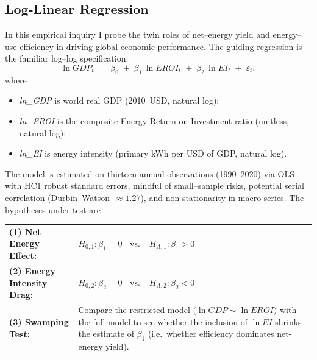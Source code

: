\documentclass[a4paper,12pt]{article}
\begin{document}
\subsection{Log-Linear Regression}
In this empirical inquiry I probe the twin roles of net--energy yield and
energy--use efficiency in driving global economic performance.  The guiding
regression is the familiar log--log specification:
\[
    \ln GDP_{t}
    \;=\;
    \beta_{0}
    \;+\;
    \beta_{1}\,\ln EROI_{t}
    \;+\;
    \beta_{2}\,\ln EI_{t}
    \;+\;
    \varepsilon_{t},
\]
where
\begin{itemize}[leftmargin=1.5em]
    \item \emph{ln\_GDP} is world real GDP (2010~USD, natural log);
    \item \emph{ln\_EROI} is the composite Energy Return on Investment ratio
          (unitless, natural log);
    \item \emph{ln\_EI} is energy intensity (primary kWh per USD of GDP,
          natural log).
\end{itemize}

The model is estimated on thirteen annual observations (1990--2020) via OLS with
HC1 robust standard errors, mindful of small--sample risks, potential serial
correlation (Durbin--Watson~$\approx 1.27$), and non-stationarity in macro
series.  The hypotheses under test are

\begin{center}
\begin{tabularx}{\textwidth}{@{}l X@{}}
\textbf{(1) Net Energy Effect:} &
  $H_{0,1}: \beta_{1}=0 \;\;$ vs.\ $\;\; H_{A,1}: \beta_{1}>0$ \\[4pt]

\textbf{(2) Energy–Intensity Drag:} &
  $H_{0,2}: \beta_{2}=0 \;\;$ vs.\ $\;\; H_{A,2}: \beta_{2}<0$ \\[4pt]

\textbf{(3) Swamping Test:} &
  Compare the restricted model $\bigl(\ln GDP \sim \ln EROI\bigr)$ with the
  full model to see whether the inclusion of $\ln EI$ shrinks the estimate of
  $\beta_{1}$ (i.e.\ whether efficiency dominates net-energy yield). \\
\end{tabularx}
\end{center}
\end{document}
